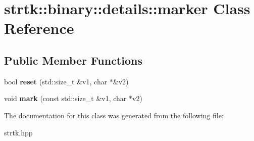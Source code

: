 \hypertarget{classstrtk_1_1binary_1_1details_1_1marker}{\section{strtk\-:\-:binary\-:\-:details\-:\-:marker Class Reference}
\label{classstrtk_1_1binary_1_1details_1_1marker}
}
\subsection*{Public Member Functions}
\begin{DoxyCompactItemize}
\item 
\hypertarget{classstrtk_1_1binary_1_1details_1_1marker_aaed5106939c231ee60adb47ce3e94675}{bool {\bfseries reset} (std\-::size\-\_\-t \&v1, char $\ast$\&v2)}\label{classstrtk_1_1binary_1_1details_1_1marker_aaed5106939c231ee60adb47ce3e94675}

\item 
\hypertarget{classstrtk_1_1binary_1_1details_1_1marker_abb8a626bd0f7b4523a6362762a80ef71}{void {\bfseries mark} (const std\-::size\-\_\-t \&v1, char $\ast$v2)}\label{classstrtk_1_1binary_1_1details_1_1marker_abb8a626bd0f7b4523a6362762a80ef71}

\end{DoxyCompactItemize}


The documentation for this class was generated from the following file\-:\begin{DoxyCompactItemize}
\item 
strtk.\-hpp\end{DoxyCompactItemize}
